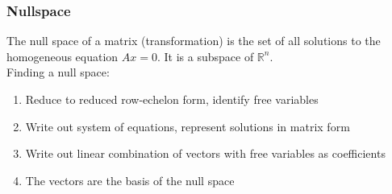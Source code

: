 \documentclass{beamer}
\begin{document}
\begin{frame}
    \frametitle{Nullspace}
    The null space of a matrix (transformation) is the set of all solutions to the homogeneous equation $Ax=0$. It is a subspace of $\mathbb{R}^n$. \\
    Finding a null space:
    \begin{enumerate}
        \item Reduce to reduced row-echelon form, identify free variables
        \item Write out system of equations, represent solutions in matrix form
        \item Write out linear combination of vectors with free variables as coefficients
        \item The vectors are the basis of the null space
    \end{enumerate}
\end{frame}
\end{document}

